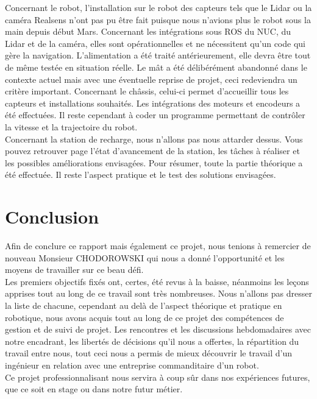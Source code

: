 \documentclass[french]{rapportENSTAB}
\begin{document}
Concernant le robot, l'installation sur le robot des capteurs tels que le Lidar ou la caméra Realsens n'ont pas pu être fait puisque nous n'avions plus le robot sous la main depuis début Mars. Concernant les intégrations sous ROS du NUC, du Lidar et de la caméra, elles sont opérationnelles et ne nécessitent qu'un code qui gère la navigation. L'alimentation a été traité antérieurement, elle devra être tout de même testée en situation réelle. Le mât a été délibérément abandonné dans le contexte actuel mais avec une éventuelle reprise de projet, ceci redeviendra un critère important. Concernant le châssis, celui-ci permet d'accueillir tous les capteurs et installations souhaités. Les intégrations des moteurs et encodeurs a été effectuées. Il reste cependant à coder un programme permettant de contrôler la vitesse et la trajectoire du robot.\\

Concernant la station de recharge, nous n'allons pas nous attarder dessus. Vous pouvez retrouver page \pageref{station} l'état d'avancement de la station, les tâches à réaliser et les possibles améliorations envisagées. Pour résumer, toute la partie théorique a été effectuée. Il reste l'aspect pratique et le test des solutions envisagées.



\section{Conclusion}

Afin de conclure ce rapport mais également ce projet, nous tenions à remercier de nouveau Monsieur CHODOROWSKI qui nous a donné l'opportunité et les moyens de travailler sur ce beau défi. \\

Les premiers objectifs fixés ont, certes, été revus à la baisse, néanmoins les leçons apprises tout au long de ce travail sont très nombreuses. Nous n'allons pas dresser la liste de chacune, cependant au delà de l'aspect théorique et pratique en robotique, nous avons acquis tout au long de ce projet des compétences de gestion et de suivi de projet. Les rencontres et les discussions hebdomadaires avec notre encadrant, les libertés de décisions qu'il nous a offertes, la répartition du travail entre nous, tout ceci nous a permis de mieux découvrir le travail d'un ingénieur en relation avec une entreprise commanditaire d'un robot. \\

Ce projet professionnalisant nous servira à coup sûr dans nos expériences futures, que ce soit en stage ou dans notre futur métier. \\
\end{document}
